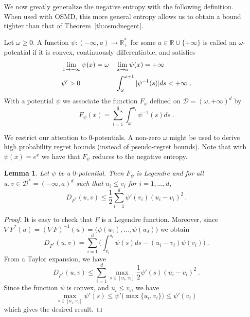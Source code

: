 \documentclass[11pt]{hackednow}
\newtheorem{lemma}{Lemma}[chapter]
\newcommand{\R}{\mathbb{R}}
\newcommand{\cD}{\mathcal{D}}
\begin{document}
%
%
We now greatly generalize the negative entropy with the following definition. When used with OSMD, this more general entropy allows us to obtain a bound tighter than that of Theorem~\ref{th:osmdnegent}.
\begin{definition}
Let $\omega \ge 0$.
A function 
$\psi: (-\infty,a) \rightarrow \R^*_+$ for some 
$a\in\R\cup\{+\infty\}$ is called an 
$\omega$-potential if it is convex,
 continuously differentiable, and satisfies
\begin{align*} 
& \lim_{x\rightarrow -\infty} \psi(x)=\omega &&
\lim_{x\rightarrow a} \psi(x)= +\infty \notag \\
& \psi' > 0 && \int_{\omega}^{\omega+1} |\psi^{-1}(s)|ds <+\infty~.
\end{align*}
With a potential $\psi$ we associate the function $F_{\psi}$ defined on $\cD=(\omega, +\infty)^d$ by
$$F_{\psi}(x) = \sum_{i=1}^d \int_{\omega}^{x_i} \psi^{-1}(s) ds~.$$
\end{definition}
%
We restrict our attention to $0$-potentials. A non-zero $\omega$ might be used to derive high probability regret bounds (instead of pseudo-regret bounds). Note that with $\psi(x)=e^x$ we have that $F_{\psi}$ reduces to the negative entropy.
\begin{lemma} \label{lem:psi}
Let $\psi$ be a $0$-potential. Then $F_{\psi}$ is Legendre
and for all $u,v \in \cD^*=(-\infty,a)^d$ such that $u_i \leq v_i$ for $i=1,\hdots,d$,
$$D_{F^*}(u,v) \leq \frac{1}{2} \sum_{i=1}^d \psi'(v_i) (u_i - v_i)^2~.$$
\end{lemma}
%
\begin{proof}
It is easy to check that $F$ is a Legendre function. Moreover, since
	$
  \nabla F^*(u)= (\nabla F)^{-1}(u)= \big(\psi(u_1),\dots,\psi(u_d)\big)
	$
we obtain
	$$
  D_{F^*}(u,v)=\sum_{i=1}^d \bigg(\int_{v_i}^{u_i} \psi(s)ds-(u_i-v_i)\psi(v_i)\bigg)~.
  $$
From a Taylor expansion, we have
	$$
	D_{F^*}(u,v)\le\sum_{i=1}^d \max_{s\in[u_i,v_i]} \frac12 \psi'(s) (u_i-v_i)^2~.
	$$
Since the function $\psi$ is convex, and $u_i \leq v_i$, we have
	$$
	\max_{s\in[u_i,v_i]} \psi'(s) \le \psi'\big(\max\{u_i,v_i\}\big) \leq \psi'(v_i)
	$$
which gives the desired result.
\end{proof}
\end{document}
